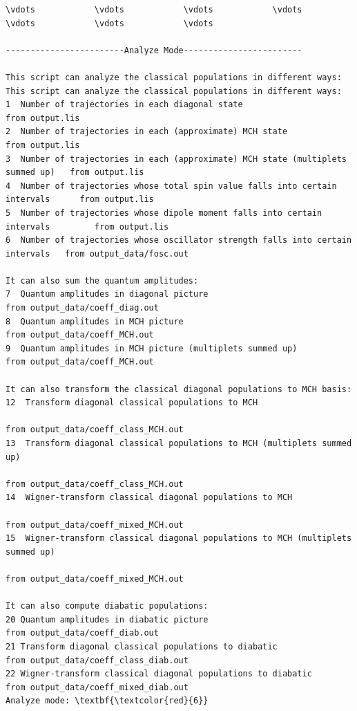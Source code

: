 \documentclass[a4paper,11pt,DIV=15,openany]{scrbook}
\begin{document}
\begin{oframed}
\footnotesize\begin{Verbatim}[commandchars=\\\{\}]
\vdots            \vdots            \vdots            \vdots            \vdots            \vdots            \vdots            

------------------------Analyze Mode------------------------

This script can analyze the classical populations in different ways:
This script can analyze the classical populations in different ways:
1  Number of trajectories in each diagonal state                                   from output.lis
2  Number of trajectories in each (approximate) MCH state                          from output.lis
3  Number of trajectories in each (approximate) MCH state (multiplets summed up)   from output.lis
4  Number of trajectories whose total spin value falls into certain intervals      from output.lis
5  Number of trajectories whose dipole moment falls into certain intervals         from output.lis
6  Number of trajectories whose oscillator strength falls into certain intervals   from output_data/fosc.out

It can also sum the quantum amplitudes:
7  Quantum amplitudes in diagonal picture                                    from output_data/coeff_diag.out
8  Quantum amplitudes in MCH picture                                         from output_data/coeff_MCH.out
9  Quantum amplitudes in MCH picture (multiplets summed up)                  from output_data/coeff_MCH.out

It can also transform the classical diagonal populations to MCH basis:
12  Transform diagonal classical populations to MCH
                                                                        from output_data/coeff_class_MCH.out
13  Transform diagonal classical populations to MCH (multiplets summed up)
                                                                        from output_data/coeff_class_MCH.out 
14  Wigner-transform classical diagonal populations to MCH
                                                                        from output_data/coeff_mixed_MCH.out
15  Wigner-transform classical diagonal populations to MCH (multiplets summed up)
                                                                        from output_data/coeff_mixed_MCH.out

It can also compute diabatic populations:
20 Quantum amplitudes in diabatic picture                              from output_data/coeff_diab.out
21 Transform diagonal classical populations to diabatic                from output_data/coeff_class_diab.out
22 Wigner-transform classical diagonal populations to diabatic         from output_data/coeff_mixed_diab.out
Analyze mode: \textbf{\textcolor{red}{6}}


\end{Verbatim}
\end{oframed}
\end{document}
